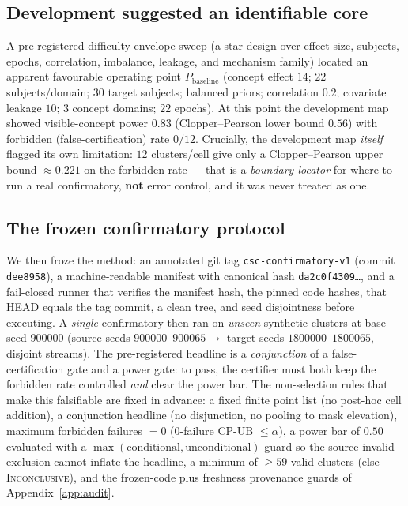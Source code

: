 \subsection{Development suggested an identifiable core}
A pre-registered difficulty-envelope sweep (a star design over effect size, subjects, epochs, correlation,
imbalance, leakage, and mechanism family) located an apparent favourable operating point $P_{\text{baseline}}$
(concept effect $14$; $22$ subjects/domain; $30$ target subjects; balanced priors; correlation $0.2$;
covariate leakage $10$; $3$ concept domains; $22$ epochs). At this point the development map showed visible-concept
power $0.83$ (Clopper--Pearson lower bound $0.56$) with forbidden (false-certification) rate $0/12$.
Crucially, the development map \emph{itself} flagged its own limitation: $12$ clusters/cell give only a
Clopper--Pearson upper bound $\approx 0.221$ on the forbidden rate --- that is a \emph{boundary locator} for
where to run a real confirmatory, \textbf{not} error control, and it was never treated as one.

\subsection{The frozen confirmatory protocol}
We then froze the method: an annotated git tag \texttt{csc-confirmatory-v1} (commit \texttt{dee8958}), a
machine-readable manifest with canonical hash \texttt{da2c0f4309\dots}, and a fail-closed runner that verifies
the manifest hash, the pinned code hashes, that HEAD equals the tag commit, a clean tree, and seed disjointness
before executing. A \emph{single} confirmatory then ran on \emph{unseen} synthetic clusters at base seed $900000$
(source seeds $900000\text{--}900065 \rightarrow$ target seeds $1800000\text{--}1800065$, disjoint streams).
The pre-registered headline is a \emph{conjunction} of a false-certification gate and a power gate: to pass,
the certifier must both keep the forbidden rate controlled \emph{and} clear the power bar. The non-selection
rules that make this falsifiable are fixed in advance: a fixed finite point list (no post-hoc cell addition),
a conjunction headline (no disjunction, no pooling to mask elevation), maximum forbidden failures $=0$
($0$-failure CP-UB $\leq \alpha$), a power bar of $0.50$ evaluated with a $\max(\text{conditional},
\text{unconditional})$ guard so the source-invalid exclusion cannot inflate the headline, a minimum of $\geq
59$ valid clusters (else \textsc{Inconclusive}), and the frozen-code plus freshness provenance guards of
Appendix~\ref{app:audit}.

